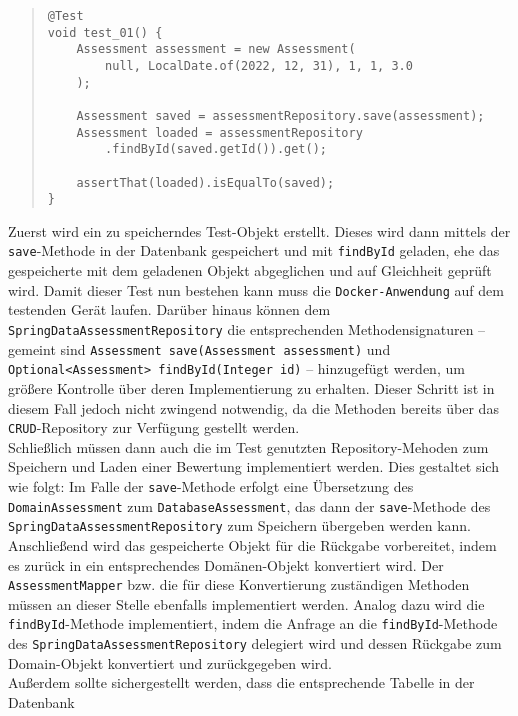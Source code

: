 \begin{quote}
\begin{verbatim}
@Test
void test_01() {
    Assessment assessment = new Assessment(
        null, LocalDate.of(2022, 12, 31), 1, 1, 3.0
    );

    Assessment saved = assessmentRepository.save(assessment);
    Assessment loaded = assessmentRepository
        .findById(saved.getId()).get();

    assertThat(loaded).isEqualTo(saved);
}
\end{verbatim}
\end{quote}

Zuerst wird ein zu speicherndes Test-Objekt erstellt. Dieses wird dann mittels der 
\texttt{save}-Methode in der Datenbank gespeichert und mit \texttt{findById} geladen, 
ehe das gespeicherte mit dem geladenen Objekt abgeglichen und auf Gleichheit geprüft 
wird. Damit dieser Test nun bestehen kann muss die \texttt{Docker-Anwendung} auf dem 
testenden Gerät laufen. Darüber hinaus können dem 
\texttt{SpringDataAssessmentRepository} die entsprechenden Methodensignaturen -- 
gemeint sind \texttt{Assessment save(Assessment assessment)} und 
\texttt{Optional<Assessment> findById(Integer id)} -- hinzugefügt werden, um größere 
Kontrolle über deren Implementierung zu erhalten. Dieser Schritt ist in diesem Fall 
jedoch nicht zwingend notwendig, da die Methoden bereits über das 
\texttt{CRUD}-Repository zur Verfügung gestellt werden. \\ 
Schließlich müssen dann auch die im Test genutzten Repository-Mehoden zum Speichern 
und Laden einer Bewertung implementiert werden. Dies gestaltet sich wie folgt: Im 
Falle der \texttt{save}-Methode erfolgt eine Übersetzung des \texttt{DomainAssessment} 
zum \texttt{DatabaseAssessment}, das dann der \texttt{save}-Methode des 
\texttt{SpringDataAssessmentRepository} zum Speichern übergeben werden kann. 
Anschließend wird das gespeicherte Objekt für die Rückgabe vorbereitet, indem es 
zurück in ein entsprechendes Domänen-Objekt konvertiert wird. Der 
\texttt{AssessmentMapper} bzw. die für diese Konvertierung zuständigen Methoden 
müssen an dieser Stelle ebenfalls implementiert werden. Analog dazu wird die 
\texttt{findById}-Methode implementiert, indem die Anfrage an die 
\texttt{findById}-Methode des \texttt{SpringDataAssessmentRepository} delegiert wird 
und dessen Rückgabe zum Domain-Objekt konvertiert und zurückgegeben wird. \\ 
Außerdem sollte sichergestellt werden, dass die entsprechende Tabelle in der Datenbank 
